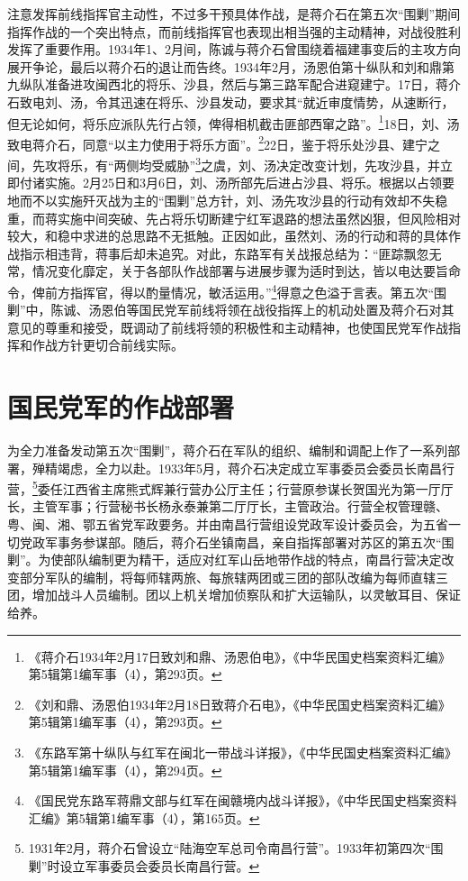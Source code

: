 注意发挥前线指挥官主动性，不过多干预具体作战，是蒋介石在第五次“围剿”期间指挥作战的一个突出特点，而前线指挥官也表现出相当强的主动精神，对战役胜利发挥了重要作用。1934年1、2月间，陈诚与蒋介石曾围绕着福建事变后的主攻方向展开争论，最后以蒋介石的退让而告终。1934年2月，汤恩伯第十纵队和刘和鼎第九纵队准备进攻闽西北的将乐、沙县，然后与第三路军配合进窥建宁。17日，蒋介石致电刘、汤，令其迅速在将乐、沙县发动，要求其“就近审度情势，从速断行，但无论如何，将乐应派队先行占领，俾得相机截击匪部西窜之路”。\footnote{《蒋介石1934年2月17日致刘和鼎、汤恩伯电》，《中华民国史档案资料汇编》第5辑第1编军事（4），第293页。}18日，刘、汤致电蒋介石，同意“以主力使用于将乐方面”。\footnote{《刘和鼎、汤恩伯1934年2月18日致蒋介石电》，《中华民国史档案资料汇编》第5辑第1编军事（4），第293页。}22日，鉴于将乐处沙县、建宁之间，先攻将乐，有“两侧均受威胁”\footnote{《东路军第十纵队与红军在闽北一带战斗详报》，《中华民国史档案资料汇编》第5辑第1编军事（4），第294页。}之虞，刘、汤决定改变计划，先攻沙县，并立即付诸实施。2月25日和3月6日，刘、汤所部先后进占沙县、将乐。根据以占领要地而不以实施歼灭战为主的“围剿”总方针，刘、汤先攻沙县的行动有效却不失稳重，而蒋实施中间突破、先占将乐切断建宁红军退路的想法虽然凶狠，但风险相对较大，和稳中求进的总思路不无抵触。正因如此，虽然刘、汤的行动和蒋的具体作战指示相违背，蒋事后却未追究。对此，东路军有关战报总结为：“匪踪飘忽无常，情况变化靡定，关于各部队作战部署与进展步骤为适时到达，皆以电达要旨命令，俾前方指挥官，得以酌量情况，敏活运用。”\footnote{《国民党东路军蒋鼎文部与红军在闽赣境内战斗详报》，《中华民国史档案资料汇编》第5辑第1编军事（4），第165页。}得意之色溢于言表。第五次“围剿”中，陈诚、汤恩伯等国民党军前线将领在战役指挥上的机动处置及蒋介石对其意见的尊重和接受，既调动了前线将领的积极性和主动精神，也使国民党军作战指挥和作战方针更切合前线实际。

\section{国民党军的作战部署}


为全力准备发动第五次“围剿”，蒋介石在军队的组织、编制和调配上作了一系列部署，殚精竭虑，全力以赴。1933年5月，蒋介石决定成立军事委员会委员长南昌行营，\footnote{1931年2月，蒋介石曾设立“陆海空军总司令南昌行营”。1933年初第四次“围剿”时设立军事委员会委员长南昌行营。}委任江西省主席熊式辉兼行营办公厅主任；行营原参谋长贺国光为第一厅厅长，主管军事；行营秘书长杨永泰兼第二厅厅长，主管政治。行营全权管理赣、粤、闽、湘、鄂五省党军政要务。并由南昌行营组设党政军设计委员会，为五省一切党政军事务参谋部。随后，蒋介石坐镇南昌，亲自指挥部署对苏区的第五次“围剿”。为使部队编制更为精干，适应对红军山岳地带作战的特点，南昌行营决定改变部分军队的编制，将每师辖两旅、每旅辖两团或三团的部队改编为每师直辖三团，增加战斗人员编制。团以上机关增加侦察队和扩大运输队，以灵敏耳目、保证给养。


